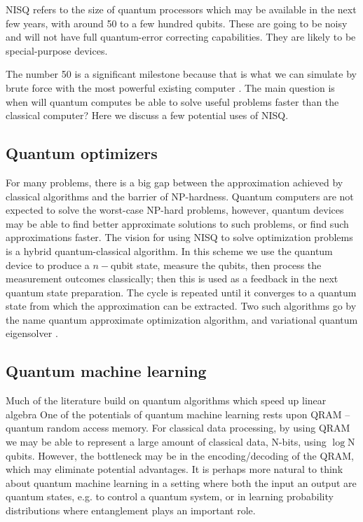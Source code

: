 NISQ refers to the size of quantum processors which may be available in the next few years, with around 50 to a few hundred qubits. These are going to be noisy and will not have full quantum-error correcting capabilities. They are likely to be special-purpose devices.

 The number 50 is a significant milestone because that is what we can simulate by brute force with the most powerful existing computer \cite{}. The main question is when will quantum computes be able to solve useful problems faster than the classical computer?
Here we discuss a few potential uses of NISQ.


\subsection{Quantum optimizers}
For many problems, there is a big gap between the approximation achieved by classical algorithms and the barrier of NP-hardness. Quantum computers are not expected to solve the worst-case NP-hard problems, however, quantum devices may be able to find better approximate solutions to such problems, or find such approximations faster. The vision for using NISQ to solve optimization problems is a hybrid quantum-classical algorithm. In this scheme we use the quantum device to produce a $n-$qubit state, measure the qubits, then process the measurement outcomes classically; then this is used as a feedback in the next quantum state preparation. The cycle is repeated until it converges to a quantum state from which the approximation can be extracted. Two such algorithms go by the name quantum approximate optimization algorithm\cite{}, and variational quantum eigensolver \cite{}.


\subsection{
Quantum machine learning}
Much of the literature build on quantum algorithms which speed up linear algebra
One of the potentials of quantum machine learning rests upon QRAM -- quantum random access memory. For classical data processing, by using QRAM we may be able to represent a large amount of classical data, N-bits, using $\log$N qubits. However, the bottleneck may be in the encoding/decoding of the QRAM, which may eliminate potential advantages. 
It is perhaps more natural to think about quantum machine learning in a setting where both the input an output are quantum states, e.g. to control a quantum system, or in learning probability distributions where entanglement plays an important role.

